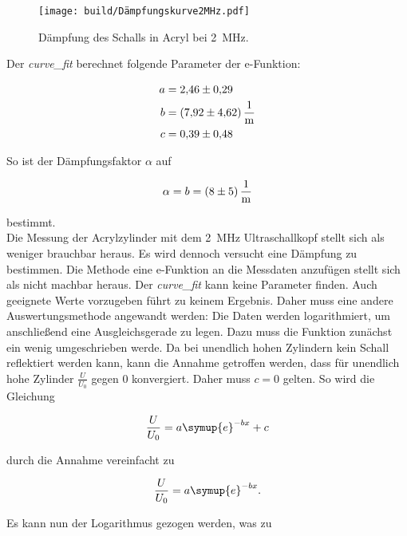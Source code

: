 \begin{figure}[H]
    \centering
    \texttt{[image: build/Dämpfungskurve2MHz.pdf]}
    \caption{Dämpfung des Schalls in Acryl bei \qty{2}{\mega\hertz}.}
    \label{fig:Kurve2MHz}
\end{figure}

\noindent Der \emph{curve\_fit} berechnet folgende Parameter der e-Funktion:

\begin{align*}
    a &= \num{2.46\pm0.29} \\
    b &= \qty{7.92\pm4.62}{\per \meter} \\
    c &= \num{0.39\pm0.48} \\
\end{align*}

\noindent So ist der Dämpfungsfaktor $\alpha$ auf 

\begin{align*}
    \alpha = b = \qty{8\pm5}{\per \meter}
\end{align*}

\noindent bestimmt.\\

\noindent Die Messung der Acrylzylinder mit dem \qty{2}{\mega\hertz} Ultraschallkopf stellt sich als weniger brauchbar heraus. 
Es wird dennoch versucht eine Dämpfung zu bestimmen. Die Methode eine e-Funktion an die Messdaten anzufügen stellt 
sich als nicht machbar heraus. Der \emph{curve\_fit} kann keine Parameter finden. Auch geeignete Werte vorzugeben 
führt zu keinem Ergebnis. Daher muss eine andere Auswertungsmethode angewandt werden: Die Daten werden logarithmiert, 
um anschließend eine Ausgleichsgerade zu legen. Dazu muss die Funktion zunächst ein wenig umgeschrieben werde. 
Da bei unendlich hohen Zylindern kein Schall reflektiert werden kann, kann die Annahme getroffen werden, dass für 
unendlich hohe Zylinder $\frac{U}{U_0}$ gegen $0$ konvergiert. Daher muss $c=0$ gelten.
So wird die Gleichung 

\begin{equation*}
    \frac{U}{U_0} = a \symup{e} ^{-bx} +c
\end{equation*}

\noindent durch die Annahme vereinfacht  zu

\begin{equation*}
    \frac{U}{U_0} = a \symup{e} ^{-bx}.
\end{equation*}

\noindent Es kann nun der Logarithmus gezogen werden, was zu 

